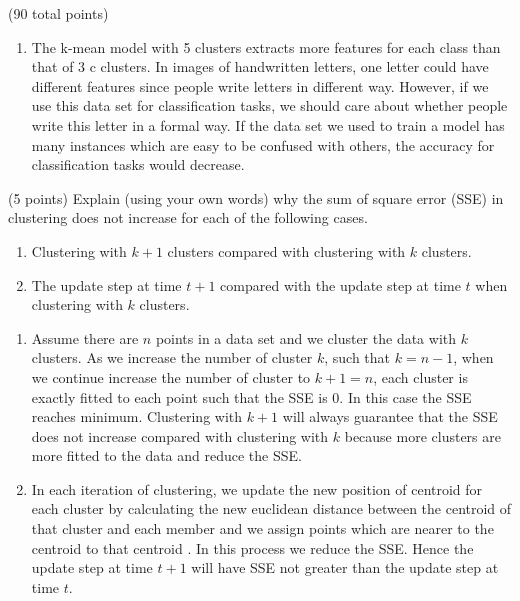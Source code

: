 \documentclass[12pt]{article}
\begin{document}
\begin{question}{(90 total points) \qTwoTitle}
\begin{subquestion}
\begin{answerbox}{0.75\textheight}
\begin{enumerate}
\begin{center}
\begin{tabular}{l l}
        \end{tabular}
        \end{center}
    \item The k-mean model with 5 clusters extracts more features for each class than that of 3 c clusters. In images of handwritten letters, one letter could have different features since people write letters in different way. However, if we use this data set for classification tasks, we should care about whether people write this letter in a formal way. If the data set we used to train a model has many instances which are easy to be confused with others, the accuracy for classification tasks would decrease.
    \end{enumerate}
  \end{answerbox}
  


\end{subquestion}

\begin{subquestion}{(5 points)
    Explain (using your own words) why the sum of square error (SSE) in \kmeans clustering does not increase for each of the following cases.
  }
  \begin{enumerate}\NARROWITEM
  \item Clustering with $k+1$ clusters compared with clustering with $k$ clusters.
  \item The update step at time $t+1$ compared with the update step at time $t$ when clustering with $k$ clusters.
  \end{enumerate}
   

  \begin{answerbox}{0.55\textheight}
    \begin{enumerate}
    \item Assume there are $n$ points in a data set and we cluster the data with $k$ clusters. As we increase the number of cluster $k$, such that $k = n-1$, when we continue increase the number of cluster to $k+1 = n$, each cluster is exactly fitted to each point such that the SSE is 0. In this case the SSE reaches minimum. Clustering with $k+1$ will always guarantee that the SSE does not increase compared with clustering with $k$ because more clusters are more fitted to the data and reduce the SSE.
    \item In each iteration of clustering, we update the new position of centroid for each cluster by calculating the new euclidean distance between the centroid of that cluster and each member and we assign points which are nearer to the centroid to that centroid . In this process we reduce the SSE. Hence the update step at time $t+1$ will have SSE not greater than the update step at time $t$.
    \end{enumerate}
  \end{answerbox}
  



\end{subquestion}
\end{question}
\end{document}
